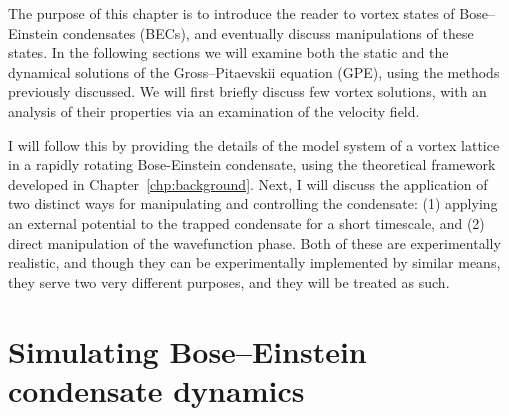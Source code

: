 The purpose of this chapter is to introduce the reader to vortex states of Bose--Einstein condensates (BECs), and eventually discuss manipulations of these states. In the following sections we will examine both the static and the dynamical solutions of the Gross--Pitaevskii equation (GPE), using the methods previously discussed. We will first briefly discuss few vortex solutions, with an analysis of their properties via an examination of the velocity field.

I will follow this by providing the details of the model system of a vortex lattice in a rapidly rotating Bose-Einstein condensate, using the theoretical framework developed in Chapter~\ref{chp:background}. Next, I will discuss the application of two distinct ways for manipulating and controlling the condensate: (1) applying an external potential to the trapped condensate for a short timescale, and (2) direct manipulation of the wavefunction phase. Both of these are experimentally realistic, and though they can be experimentally implemented by similar means, they serve two very different purposes, and they will be treated as such.

\section{Simulating Bose--Einstein condensate dynamics}


